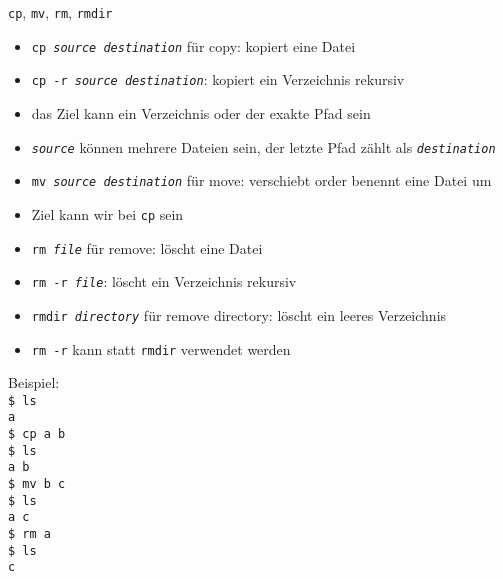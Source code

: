    \begin{frame}{\texttt{cp}, \texttt{mv}, \texttt{rm}, \texttt{rmdir}}
      \begin{itemize}
        \item \texttt{cp \textit{source} \textit{destination}} für copy: kopiert eine Datei
        \item \texttt{cp -r \textit{source} \textit{destination}}: kopiert ein Verzeichnis rekursiv
        \item das Ziel kann ein Verzeichnis oder der exakte Pfad sein
        \item \texttt{\textit{source}} können mehrere Dateien sein, der letzte Pfad zählt als \texttt{\textit{destination}}
        \item \texttt{mv \textit{source} \textit{destination}} für move: verschiebt order benennt eine Datei um
        \item Ziel kann wir bei \texttt{cp} sein
        \item \texttt{rm \textit{file}} für remove: löscht eine Datei
        \item \texttt{rm -r \textit{file}}: löscht ein Verzeichnis rekursiv
        \item \texttt{rmdir \textit{directory}} für remove directory: löscht ein leeres Verzeichnis
        \item \texttt{rm -r} kann statt \texttt{rmdir} verwendet werden
      \end{itemize}
    \end{frame}

    \begin{frame}
      Beispiel:\\
      \texttt{\$ ls\\
              a\\
              \$ cp a b\\
              \$ ls\\
              a  b\\
              \$ mv b c\\
              \$ ls\\
              a  c\\
              \$ rm a\\
              \$ ls\\
              c}
    \end{frame}

